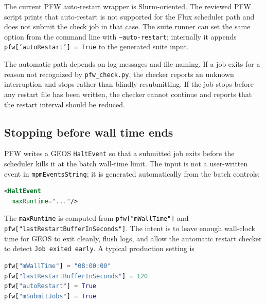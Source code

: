 The current PFW auto-restart wrapper is Slurm-oriented.  The reviewed PFW script prints that auto-restart is not supported for the Flux scheduler path and does not submit the check job in that case.  The suite runner can set the same option from the command line with \texttt{--auto-restart}; internally it appends \texttt{pfw['autoRestart'] = True} to the generated suite input.

The automatic path depends on log messages and file naming.  If a job exits for a reason not recognized by \texttt{pfw\_check.py}, the checker reports an unknown interruption and stops rather than blindly resubmitting.  If the job stops before any restart file has been written, the checker cannot continue and reports that the restart interval should be reduced.

\subsection{Stopping before wall time ends}
\label{sec:pfw-walltime-restart-buffer}

PFW writes a GEOS \texttt{HaltEvent} so that a submitted job exits before the scheduler kills it at the batch wall-time limit.  The input is not a user-written event in \texttt{mpmEventsString}; it is generated automatically from the batch controls:
\begin{lstlisting}[language=XML,caption={PFW-generated wall-clock halt event.}]
<HaltEvent
  maxRuntime="..."/>
\end{lstlisting}
The \texttt{maxRuntime} is computed from \texttt{pfw["mWallTime"]} and \texttt{pfw["lastRestartBufferInSeconds"]}.  The intent is to leave enough wall-clock time for GEOS to exit cleanly, flush logs, and allow the automatic restart checker to detect \texttt{Job exited early}.  A typical production setting is
\begin{lstlisting}[language=Python,caption={Wall-time buffer for a restartable batch job.}]
pfw["mWallTime"] = "08:00:00"
pfw["lastRestartBufferInSeconds"] = 120
pfw["autoRestart"] = True
pfw["mSubmitJobs"] = True
\end{lstlisting}

